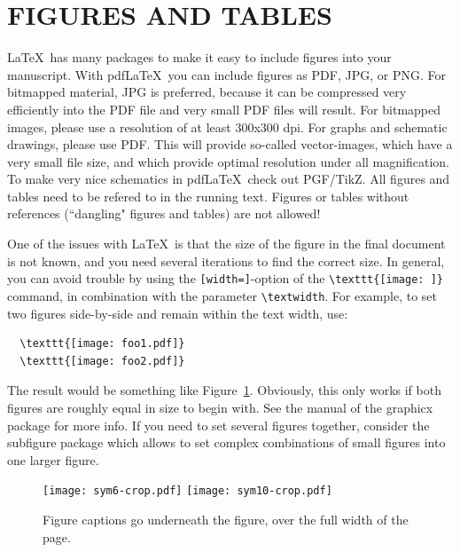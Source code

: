 \documentclass[12pt]{article}
\begin{document}
%
\section{FIGURES AND TABLES} 
\label{sect::floats}

\LaTeX\ has many packages to make it easy to include figures into your manuscript. With pdf\LaTeX\, you can include figures as PDF, JPG, or PNG. For bitmapped material, JPG is preferred, because it can be compressed very efficiently into the PDF file and very small PDF files will result. For bitmapped images, please use a resolution of at least 300x300 dpi. For graphs and schematic drawings, please use PDF. This will provide so-called vector-images, which have a very small file size, and which provide optimal resolution under all magnification. To make very nice schematics in pdf\LaTeX\, check out PGF/TikZ. All figures and tables need to be refered to in the running text. Figures or tables without references (``dangling" figures and tables) are not allowed!

One of the issues with \LaTeX\ is that the size of the figure in the final document is not known, and you need several iterations to find the correct size. In general, you can avoid trouble by using the \texttt{[width=]}-option of the \verb|\texttt{[image: ]}| command, in combination with the parameter \verb|\textwidth|. For example, to set two figures side-by-side and remain within the text width, use: 

\begin{verbatim}
  \texttt{[image: foo1.pdf]}
  \texttt{[image: foo2.pdf]}
\end{verbatim}

The result would be something like Figure~\ref{fig::sym6}. Obviously, this only works if both figures are roughly equal in size to begin with. See the manual of the graphicx package for more info. If you need to set several figures together, consider the subfigure package which allows to set complex combinations of small figures into one larger figure. 

\begin{figure}[ht!]
  \begin{center}
    \texttt{[image: sym6-crop.pdf]}
    \texttt{[image: sym10-crop.pdf]}
    \caption[]{\label{fig::sym6}Figure captions go underneath the figure, over the full width of the page.}%
  \end{center}
\end{figure}
\end{document}

